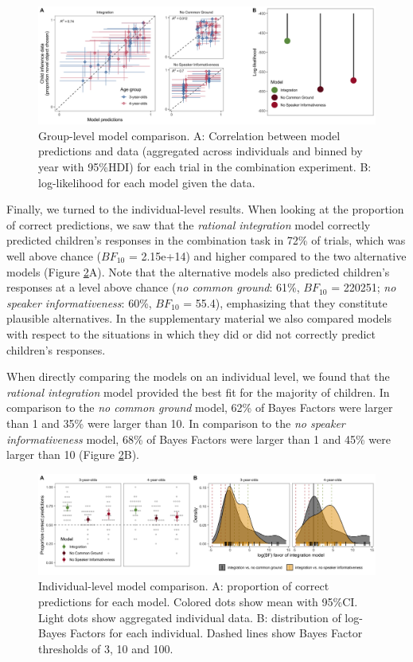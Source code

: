 \documentclass[
  man,floatsintext]{apa6}
\begin{document}
\begin{figure}
\includegraphics[width=1\linewidth]{./figures/fig3} \caption{Group-level model comparison. A: Correlation between model predictions and data (aggregated across individuals and binned by year with 95\%HDI) for each trial in the combination experiment. B: log-likelihood for each model given the data.}\label{fig:fig3}
\end{figure}

Finally, we turned to the individual-level results. When looking at the proportion of correct predictions, we saw that the \emph{rational integration} model correctly predicted children's responses in the combination task in 72\% of trials, which was well above chance (\(BF_{10}\) = 2.15e+14) and higher compared to the two alternative models (Figure \ref{fig:fig4}A). Note that the alternative models also predicted children's responses at a level above chance (\emph{no common ground}: 61\%, \(BF_{10}\) = 220251; \emph{no speaker informativeness}: 60\%, \(BF_{10}\) = 55.4), emphasizing that they constitute plausible alternatives. In the supplementary material we also compared models with respect to the situations in which they did or did not correctly predict children's responses.

When directly comparing the models on an individual level, we found that the \emph{rational integration} model provided the best fit for the majority of children. In comparison to the \emph{no common ground} model, 62\% of Bayes Factors were larger than 1 and 35\% were larger than 10. In comparison to the \emph{no speaker informativeness} model, 68\% of Bayes Factors were larger than 1 and 45\% were larger than 10 (Figure \ref{fig:fig4}B).

\begin{figure}
\includegraphics[width=1\linewidth]{./figures/fig4} \caption{Individual-level model comparison. A: proportion of correct predictions for each model. Colored dots show mean with 95\%CI. Light dots show aggregated individual data. B: distribution of log-Bayes Factors for each individual. Dashed lines show Bayes Factor thresholds of 3, 10 and 100.}\label{fig:fig4}
\end{figure}
\end{document}
